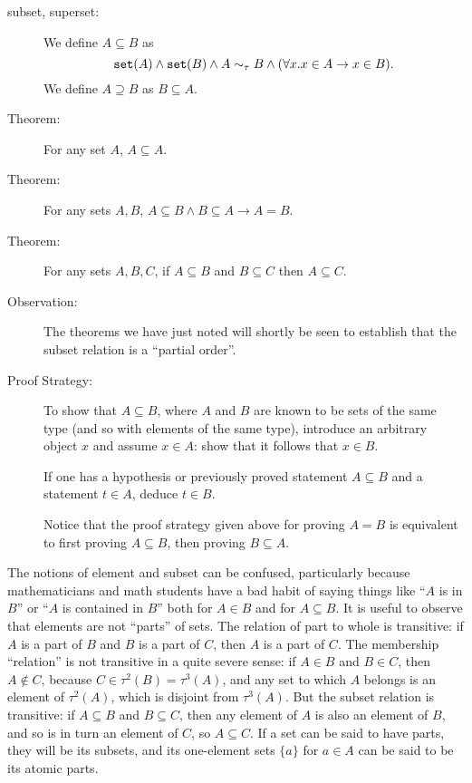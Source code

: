\documentclass[12pt]{book}
\begin{document}
\begin{description}

\item[subset, superset:] We define $A \subseteq B$ as $${\tt
set}(A)\wedge{\tt set}(B) \wedge A \sim_\tau B \wedge (\forall x.x \in A \rightarrow x \in
B).$$  We define $A \supseteq B$ as $B \subseteq A$.

\item[Theorem:] For any set $A$, $A \subseteq A$.

\item[Theorem:]  For any sets $A,B$, $A \subseteq B \wedge B \subseteq A \rightarrow A=B$.

\item[Theorem:] For any sets $A,B,C$, if $A \subseteq B$ and $B
\subseteq C$ then $A \subseteq C$.

\item[Observation:] The theorems we have just noted will shortly be
seen to establish that the subset relation is a ``partial order''.

\item[Proof Strategy:] To show that $A \subseteq B$, where $A$ and $B$
are known to be sets of the same type (and so with elements of the same type), introduce an arbitrary object $x$ and assume
$x\in A$: show that it follows that $x\in B$.

If one has a hypothesis or previously proved statement $A \subseteq B$ and a statement $t \in A$, deduce $t \in B$.

Notice that the proof strategy given above for
proving $A = B$ is equivalent to first proving $A \subseteq B$, then
proving $B \subseteq A$.

\end{description}

The notions of element and subset can be confused, particularly
because mathematicians and math students have a bad habit of saying things like ``$A$ is in $B$'' or
``$A$ is contained in $B$'' both  for $A \in B$ and for $A \subseteq B$.  It
is useful to observe that elements are not ``parts'' of sets.  The
relation of part to whole is transitive: if $A$ is a part of $B$ and
$B$ is a part of $C$, then $A$ is a part of $C$.  The membership
``relation'' is not transitive in a quite severe sense: if $A \in B$
and $B \in C$, then $A \not\in C$, because $C \in \tau^2(B) = \tau^3(A)$, and any set to which $A$ belongs is an element of $\tau^2(A)$, which is disjoint from $\tau^3(A)$.   But the subset
relation is transitive: if $A \subseteq B$ and $B \subseteq C$, then
any element of $A$ is also an element of $B$, and so is in turn an
element of $C$, so $A \subseteq C$.  If a set can be said to have
parts, they will be its subsets, and its one-element sets $\{a\}$ for
$a \in A$ can be said to be its atomic parts.
\end{document}
